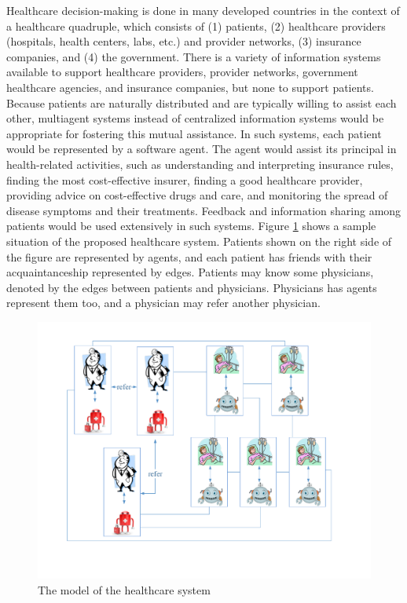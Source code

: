 Healthcare decision-making is done in many developed countries in the context of a healthcare quadruple, which consists of (1) patients, (2) healthcare providers (hospitals, health centers, labs, etc.) and provider networks, (3) insurance companies, and (4) the government. There is a variety of information systems available to support healthcare providers, provider networks, government healthcare agencies, and insurance companies, but none to support patients. Because patients are naturally distributed and are typically willing to assist each other, multiagent systems instead of centralized information systems would be appropriate for fostering this mutual assistance. In such systems, each patient would be represented by a software agent. The agent would assist its principal in health-related activities, such as understanding and interpreting insurance rules, finding the most cost-effective insurer, finding a good healthcare provider, providing advice on cost-effective drugs and care, and monitoring the spread of disease symptoms and their treatments. Feedback and information sharing among patients would be used extensively in such systems. Figure \ref{ch3:fmodelhealthcare} shows a sample situation of the proposed healthcare system. Patients shown on the right side of the figure are represented by agents, and each patient has friends with their acquaintanceship represented by edges. Patients may know some physicians, denoted by the edges between patients and physicians. Physicians has agents represent them too, and a physician may refer another physician.      

\begin{figure}
\centering
\includegraphics[scale=0.6]{chap3/chap3-model.pdf}
\caption{The model of the healthcare system}
\label{ch3:fmodelhealthcare}
\end{figure}

